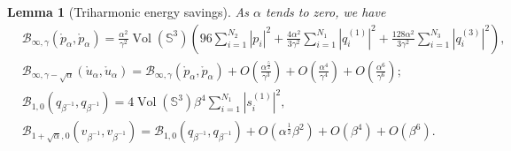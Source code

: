 \documentclass[11pt,letterpaper]{amsart}
\DeclareMathOperator{\Vol}{Vol}
\newcommand{\mB}{\mathcal{B}}
\newcommand{\bS}{\mathbb{S}}
\newtheorem{lemma}[theorem]{Lemma}
\theoremstyle{definition}
\theoremstyle{remark}
\numberwithin{equation}{section}
\begin{document}
\begin{lemma}[Triharmonic energy savings]\label{energy-savings}
    As $\alpha$ tends to zero, we have
    \begin{equation*}
        \begin{split}
            &\mB_{\infty, \gamma}(\mathring{p}_{\alpha},\mathring{p}_{\alpha})=\frac{\alpha^2}{\gamma^2}\Vol(\bS^3)\left(96\sum_{i=1}^{N_2}|p_i|^2+\frac{4\alpha^2}{3\gamma^2}\sum_{i=1}^{N_1}|q^{(1)}_i|^2 +\frac{128\alpha^2}{3\gamma^2} \sum_{i=1}^{N_3}|q^{(3)}_i|^2\right),\\
            &\mB_{\infty, \gamma-\sqrt{\alpha}}(\mathring{u}_{\alpha},\mathring{u}_{\alpha})=\mB_{\infty, \gamma}(\mathring{p}_{\alpha},\mathring{p}_{\alpha})+O\left(\frac{\alpha^{\frac{5}{2}}}{\gamma^3}\right)+O\left(\frac{\alpha^{4}}{\gamma^4}\right)+O\left(\frac{\alpha^{6}}{\gamma^6}\right);\\
            &\mB_{1, 0}(q_{\beta^{-1}},q_{\beta^{-1}})=4\Vol(\bS^3)\beta^4 \sum_{i=1}^{N_1} |s^{(1)}_i|^2,\\
            &\mB_{1+\sqrt{\alpha}, 0}(v_{\beta^{-1}},v_{\beta^{-1}})=\mB_{1, 0}(q_{\beta^{-1}},q_{\beta^{-1}})+O(\alpha^{\frac{1}{2}}\beta^2)+O(\beta^4)+O(\beta^6).
        \end{split}
    \end{equation*}
\end{lemma}
\end{document}
